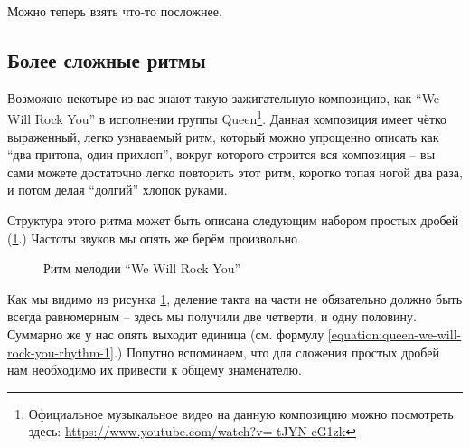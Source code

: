 \documentclass[a4paper,twoside]{book}
\begin{document}
Можно теперь взять что-то посложнее.

\subsection{Более сложные ритмы}

Возможно некотыре из вас знают такую зажигательную композицию, как ``We Will
Rock You'' в исполнении группы Queen\footnote{Официальное музыкальное видео на
данную композицию можно посмотреть здесь:
\url{https://www.youtube.com/watch?v=-tJYN-eG1zk}}. Данная композиция имеет
чётко выраженный, легко узнаваемый ритм, который можно упрощенно описать как
``два притопа, один прихлоп'', вокруг которого строится вся композиция -- вы сами
можете достаточно легко повторить этот ритм, коротко топая ногой два раза, и
потом делая ``долгий'' хлопок руками.

Структура этого ритма может быть описана следующим набором простых дробей
(\ref{fig:queen-we-will-rock-you-rhythm-1}.) Частоты звуков мы опять же берём
произвольно.

\begin{figure}[ht]
  \label{fig:queen-we-will-rock-you-rhythm-1}
  \caption{Ритм мелодии ``We Will Rock You''}
\end{figure}

Как мы видимо из рисунка \ref{fig:queen-we-will-rock-you-rhythm-1}, деление
такта на части не обязательно должно быть всегда равномерным -- здесь мы получили
две четверти, и одну половину. Суммарно же у нас опять выходит единица (см.
формулу \ref{equation:queen-we-will-rock-you-rhythm-1}.) Попутно вспоминаем, что
для сложения простых дробей нам необходимо их привести к общему знаменателю.
\end{document}
